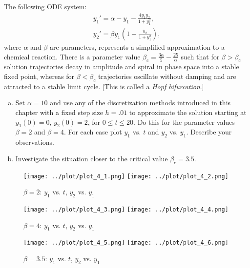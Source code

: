 \begin{problem}[A\&P 3.3]
  The following ODE system:
  \begin{align*}
    y_1' = \alpha - y_1 - \frac{4y_1 y_2}{1 + y_1^2}, \\
    y_2' = \beta y_1 \left(1 - \frac{y_2}{1 + y_1^2}\right),
  \end{align*}
  where $\alpha$ and $\beta$ are parameters, represents a simplified approximation to a chemical reaction. There is a parameter value $\beta_c = \frac{3\alpha}{5} - \frac{25}{\alpha}$ such that for $\beta > \beta_c$ solution trajectories decay in amplitude and spiral in phase space into a stable fixed point, whereas for $\beta < \beta_c$ trajectories oscillate without damping and are attracted to a stable limit cycle. [This is called a \emph{Hopf bifurcation}.]
  \begin{enumerate}[(a)]
    \item Set $\alpha = 10$ and use any of the discretization methods introduced in this chapter with a fixed step size $h = .01$ to approximate the solution starting at $y_1(0) = 0$, $y_2(0) = 2$, for $0 \leq t \leq 20$. Do this for the parameter values $\beta = 2$ and $\beta = 4$. For each case plot $y_1$ vs. $t$ and $y_2$ vs. $y_1$. Describe your observations.
    \item Investigate the situation closer to the critical value $\beta_c = 3.5$.
  \end{enumerate}
\end{problem}

\begin{solution}
  \begin{figure}[!ht]
    \centering
    \texttt{[image: ../plot/plot\_4\_1.png]}
    \texttt{[image: ../plot/plot\_4\_2.png]}
    \caption{$\beta = 2$: $y_1$ vs. $t$, $y_2$ vs. $y_1$}
    \label{fig:prob4_1}
  \end{figure}
  \begin{figure}[!ht]
    \centering
    \texttt{[image: ../plot/plot\_4\_3.png]}
    \texttt{[image: ../plot/plot\_4\_4.png]}
    \caption{$\beta = 4$: $y_1$ vs. $t$, $y_2$ vs. $y_1$}
    \label{fig:prob4_2}
  \end{figure}
  \begin{figure}[!ht]
    \centering
    \texttt{[image: ../plot/plot\_4\_5.png]}
    \texttt{[image: ../plot/plot\_4\_6.png]}
    \caption{$\beta = 3.5$: $y_1$ vs. $t$, $y_2$ vs. $y_1$}
    \label{fig:prob4_3}
  \end{figure}
\end{solution}
